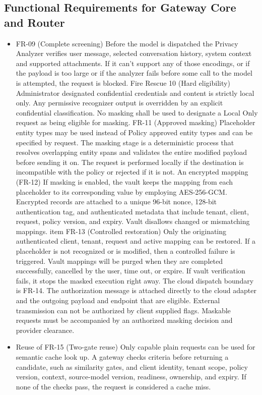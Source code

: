 \documentclass{FastFyp}
\begin{document}
\subsection{Functional Requirements for Gateway Core and Router}
\begin{itemize}
\item FR-09 (Complete screening)
Before the model is dispatched the Privacy Analyzer verifies user message, selected conversation history, system context and supported attachments. If it can't support any of those encodings, or if the payload is too large or if the analyzer fails before some call to the model is attempted, the request is blocked.
Fire Rescue 10 (Hard eligibility)
Administrator designated confidential credentials and content is strictly local only. Any permissive recognizer output is overridden by an explicit confidential classification. No masking shall be used to designate a Local Only request as being eligible for masking.
FR-11 (Approved masking)
Placeholder entity types may be used instead of Policy approved entity types and can be specified by request. The masking stage is a deterministic process that resolves overlapping entity spans and validates the entire modified payload before sending it on. The request is performed locally if the destination is incompatible with the policy or rejected if it is not.
An encrypted mapping (FR-12)
If masking is enabled, the vault keeps the mapping from each placeholder to its corresponding value by employing AES-256-GCM. Encrypted records are attached to a unique 96-bit nonce, 128-bit authentication tag, and authenticated metadata that include tenant, client, request, policy version, and expiry. Vault disallows changed or mismatching mappings.
item FR-13 (Controlled restoration)
Only the originating authenticated client, tenant, request and active mapping can be restored. If a placeholder is not recognized or is modified, then a controlled failure is triggered. Vault mappings will be purged when they are completed successfully, cancelled by the user, time out, or expire. If vault verification fails, it stops the masked execution right away.
The cloud dispatch boundary is FR-14.
The authorization message is attached directly to the cloud adapter and the outgoing payload and endpoint that are eligible. External transmission can not be authorized by client supplied flags. Maskable requests must be accompanied by an authorized masking decision and provider clearance.
\item Reuse of FR-15 (Two-gate reuse)
Only capable plain requests can be used for semantic cache look up. A gateway checks criteria before returning a candidate, such as similarity gates, and client identity, tenant scope, policy version, context, source-model version, readiness, ownership, and expiry. If none of the checks pass, the request is considered a cache miss.

\end{itemize}
\end{document}
